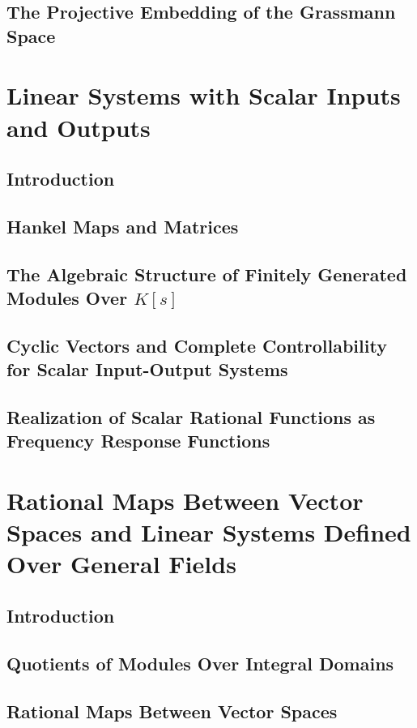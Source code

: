 \documentclass[12pt]{book}
\theoremstyle{plain}
\theoremstyle{definition}
\begin{document}
\section{The Projective Embedding of the Grassmann Space}

\chapter{Linear Systems with Scalar Inputs and Outputs}

\section{Introduction}

\section{Hankel Maps and Matrices}

\section{The Algebraic Structure of Finitely Generated Modules Over $K[s]$}

\section{Cyclic Vectors and Complete Controllability for Scalar Input-Output Systems}

\section{Realization of Scalar Rational Functions as Frequency Response Functions}

\chapter{Rational Maps Between Vector Spaces and Linear Systems Defined Over General Fields}

\section{Introduction}

\section{Quotients of Modules Over Integral Domains}

\section{Rational Maps Between Vector Spaces}
\end{document}
